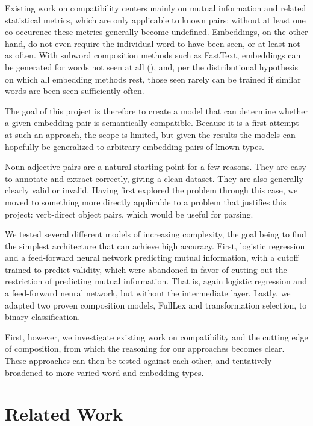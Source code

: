 \documentclass[a4paper, 12pt]{article}
\begin{document}
Existing work on compatibility centers mainly on mutual information and related statistical metrics, which are only applicable to known pairs; without at least one co-occurence these metrics generally become undefined. Embeddings, on the other hand, do not even require the individual word to have been seen, or at least not as often. With subword composition methods such as FastText, embeddings can be generated for words not seen at all (\cite{FastText}), and, per the distributional hypothesis on which all embedding methods rest, those seen rarely can be trained if similar words are been seen sufficiently often.

The goal of this project is therefore to create a model that can determine whether a given embedding pair is semantically compatible. Because it is a first attempt at such an approach, the scope is limited, but given the results the models can hopefully be generalized to arbitrary embedding pairs of known types.

Noun-adjective pairs are a natural starting point for a few reasons. They are easy to annotate and extract correctly, giving a clean dataset. They are also generally clearly valid or invalid. Having first explored the problem through this case, we moved to something more directly applicable to a problem that justifies this project: verb-direct object pairs, which would be useful for parsing.

We tested several different models of increasing complexity, the goal being to find the simplest architecture that can achieve high accuracy. First, logistic regression and a feed-forward neural network predicting mutual information, with a cutoff trained to predict validity, which were abandoned in favor of cutting out the restriction of predicting mutual information. That is, again logistic regression and a feed-forward neural network, but without the intermediate layer. Lastly, we adapted two proven composition models, FullLex and transformation selection, to binary classification.

First, however, we investigate existing work on compatibility and the cutting edge of composition, from which the reasoning for our approaches becomes clear. These approaches can then be tested against each other, and tentatively broadened to more varied word and embedding types.


\section{Related Work}
\end{document}
